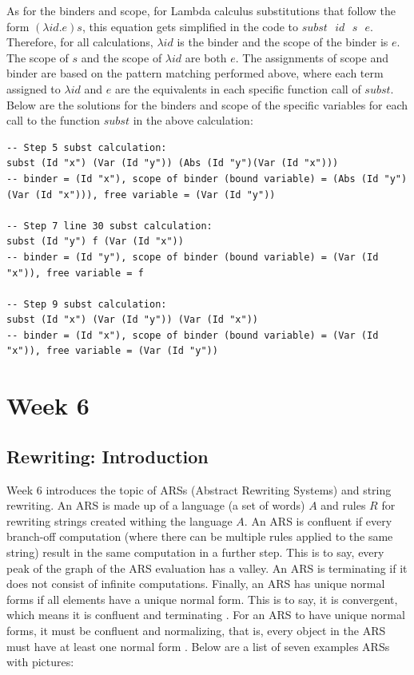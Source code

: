 \documentclass{article}
\theoremstyle{theorem}
\theoremstyle{definition}
\theoremstyle{remark}
\begin{document}
As for the binders and scope, for Lambda calculus substitutions that follow the form $(\lambda id.e)s$, this equation gets simplified in the code to $subst \text{ } id \text{ } s \text{ } e$. Therefore, for all calculations, $\lambda id$ is the binder and the scope of the binder is $e$. The scope of $s$ and the scope of $\lambda id$ are both $e$. The assignments of scope and binder are based on the pattern matching performed above, where each term assigned to $\lambda id$ and $e$ are the equivalents in each specific function call of $subst$. Below are the solutions for the binders and scope of the specific variables for each call to the function $subst$ in the above calculation: 

\begin{lstlisting}
-- Step 5 subst calculation:
subst (Id "x") (Var (Id "y")) (Abs (Id "y")(Var (Id "x"))) 
-- binder = (Id "x"), scope of binder (bound variable) = (Abs (Id "y")(Var (Id "x"))), free variable = (Var (Id "y")) 

-- Step 7 line 30 subst calculation:
subst (Id "y") f (Var (Id "x")) 
-- binder = (Id "y"), scope of binder (bound variable) = (Var (Id "x")), free variable = f

-- Step 9 subst calculation:
subst (Id "x") (Var (Id "y")) (Var (Id "x"))
-- binder = (Id "x"), scope of binder (bound variable) = (Var (Id "x")), free variable = (Var (Id "y"))
\end{lstlisting}

\section{Week 6}

\subsection{Rewriting: Introduction}

Week 6 introduces the topic of ARSs (Abstract Rewriting Systems) and string rewriting. An ARS is made up of a language (a set of words) $A$ and rules $R$ for rewriting strings created withing the language $A$. An ARS is confluent if every branch-off computation (where there can be multiple rules applied to the same string) result in the same computation in a further step. This is to say, every peak of the graph of the ARS evaluation has a valley. An ARS is terminating if it does not consist of infinite computations. Finally, an ARS has unique normal forms if all elements have a unique normal form. This is to say, it is convergent, which means it is confluent and terminating \cite{Ars}. For an ARS to have unique normal forms, it must be confluent and normalizing, that is, every object in the ARS must have at least one normal form \cite{Ars}. Below are a list of seven examples ARSs with pictures:
\end{document}
